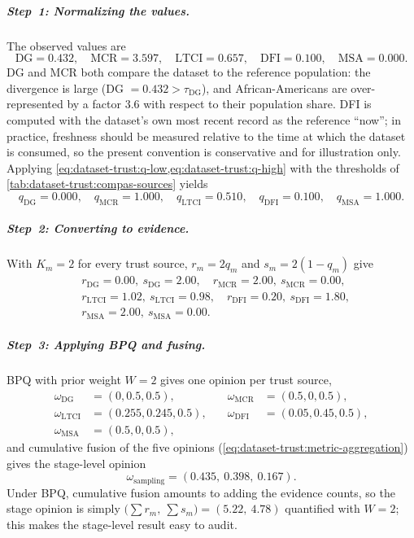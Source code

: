 \subparagraph{Step~1: Normalizing the values.}
The observed values are
\[
\text{DG} = 0.432,\quad \text{MCR} = 3.597,\quad
\text{LTCI} = 0.657,\quad \text{DFI} = 0.100,\quad
\text{MSA} = 0.000.
\]
DG and MCR both compare the dataset to the reference population: the divergence is large (DG $= 0.432 > \tau_{\text{DG}}$), and African-Americans are over-represented by a factor $3.6$ with respect to their population share. DFI is computed with the dataset's own most recent record as the reference ``now''; in practice, freshness should be measured relative to the time at which the dataset is consumed, so the present convention is conservative and for illustration only. Applying \cref{eq:dataset-trust:q-low,eq:dataset-trust:q-high} with the thresholds of \cref{tab:dataset-trust:compas-sources} yields
\[
q_{\text{DG}}   = 0.000,\quad
q_{\text{MCR}}  = 1.000,\quad
q_{\text{LTCI}} = 0.510,\quad
q_{\text{DFI}}  = 0.100,\quad
q_{\text{MSA}}  = 1.000.
\]

\subparagraph{Step~2: Converting to evidence.}
With $K_m = 2$ for every trust source, $r_m = 2 q_m$ and $s_m = 2(1 - q_m)$ give
\[
\begin{aligned}
& r_{\text{DG}}   = 0.00,\ s_{\text{DG}}   = 2.00, \quad
  r_{\text{MCR}}  = 2.00,\ s_{\text{MCR}}  = 0.00, \\
& r_{\text{LTCI}} = 1.02,\ s_{\text{LTCI}} = 0.98, \quad
  r_{\text{DFI}}  = 0.20,\ s_{\text{DFI}}  = 1.80, \\
& r_{\text{MSA}}  = 2.00,\ s_{\text{MSA}}  = 0.00.
\end{aligned}
\]

\subparagraph{Step~3: Applying \ac{BPQ} and fusing.}
\ac{BPQ} with prior weight $W = 2$ gives one opinion per trust source,
\begin{align}
 \omega_{\text{DG}}   &= (0, 0.5, 0.5), \quad&
  \omega_{\text{MCR}}  &= (0.5, 0, 0.5),\\
\omega_{\text{LTCI}} &= (0.255, 0.245, 0.5), \quad&
  \omega_{\text{DFI}}  &= (0.05, 0.45, 0.5), \\
\omega_{\text{MSA}}  &= (0.5, 0, 0.5),
\end{align}
and cumulative fusion of the five opinions (\cref{eq:dataset-trust:metric-aggregation}) gives the stage-level opinion
\[
\omega_{\text{sampling}} = (0.435,\ 0.398,\ 0.167).
\]
Under \ac{BPQ}, cumulative fusion amounts to adding the evidence counts, so the stage opinion is simply $\bigl(\sum r_m,\ \sum s_m\bigr) = (5.22,\ 4.78)$ quantified with $W = 2$; this makes the stage-level result easy to audit.

